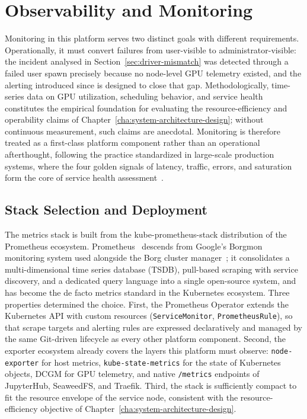 \section{Observability and Monitoring}
\label{sec:observability}

Monitoring in this platform serves two distinct goals with different requirements. Operationally, it must convert failures from user-visible to administrator-visible: the incident analysed in Section~\ref{sec:driver-mismatch} was detected through a failed user spawn precisely because no node-level GPU telemetry existed, and the alerting introduced since is designed to close that gap. Methodologically, time-series data on GPU utilization, scheduling behavior, and service health constitutes the empirical foundation for evaluating the resource-efficiency and operability claims of Chapter~\ref{cha:system-architecture-design}; without continuous measurement, such claims are anecdotal. Monitoring is therefore treated as a first-class platform component rather than an operational afterthought, following the practice standardized in large-scale production systems, where the four golden signals of latency, traffic, errors, and saturation form the core of service health assessment~\cite{beyer2016sre}.

\subsection{Stack Selection and Deployment}

The metrics stack is built from the kube-prometheus-stack distribution of the Prometheus ecosystem. Prometheus~\citep{volz2015prometheus} descends from Google's Borgmon monitoring system used alongside the Borg cluster manager~\citep{burns2016borg}; it consolidates a multi-dimensional time series database (TSDB), pull-based scraping with service discovery, and a dedicated query language into a single open-source system, and has become the de facto metrics standard in the Kubernetes ecosystem. Three properties determined the choice. First, the Prometheus Operator extends the Kubernetes API with custom resources (\texttt{ServiceMonitor}, \texttt{PrometheusRule}), so that scrape targets and alerting rules are expressed declaratively and managed by the same Git-driven lifecycle as every other platform component. Second, the exporter ecosystem already covers the layers this platform must observe: \texttt{node-exporter} for host metrics, \texttt{kube-state-metrics} for the state of Kubernetes objects, DCGM for GPU telemetry, and native \texttt{/metrics} endpoints of JupyterHub, SeaweedFS, and Traefik. Third, the stack is sufficiently compact to fit the resource envelope of the service node, consistent with the resource-efficiency objective of Chapter~\ref{cha:system-architecture-design}.

